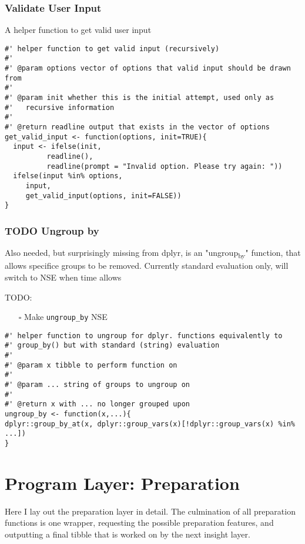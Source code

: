 \documentclass[a4paper, 11pt]{article}
\begin{document}
\subsubsection{Validate User Input}
\label{sec:org6ec7fc6}
A helper function to get valid user input
\begin{verbatim}
#' helper function to get valid input (recursively)
#'
#' @param options vector of options that valid input should be drawn from
#'
#' @param init whether this is the initial attempt, used only as
#'   recursive information
#'
#' @return readline output that exists in the vector of options
get_valid_input <- function(options, init=TRUE){
  input <- ifelse(init,
		  readline(),
		  readline(prompt = "Invalid option. Please try again: "))
  ifelse(input %in% options,
	 input,
	 get_valid_input(options, init=FALSE))
}
\end{verbatim}
\subsubsection{{\bfseries\sffamily TODO} Ungroup by}
\label{sec:orga8978da}
Also needed, but surprisingly missing from dplyr, is an "ungroup\textsubscript{by}"
function, that allows specifice groups to be removed. Currently
standard evaluation only, will switch to NSE when time allows

TODO:
\begin{itemize}
\item[{$\square$}] Make \texttt{ungroup\_by} NSE
\end{itemize}
\begin{verbatim}
#' helper function to ungroup for dplyr. functions equivalently to
#' group_by() but with standard (string) evaluation
#'
#' @param x tibble to perform function on
#'
#' @param ... string of groups to ungroup on
#'
#' @return x with ... no longer grouped upon
ungroup_by <- function(x,...){
dplyr::group_by_at(x, dplyr::group_vars(x)[!dplyr::group_vars(x) %in% ...])
}
\end{verbatim}
\section{Program Layer: Preparation}
\label{sec:orgfafcbe6}
Here I lay out the preparation layer in detail. The culmination of all
preparation functions is one wrapper, requesting the possible
preparation features, and outputting a final tibble that is worked on
by the next insight layer.
\end{document}
